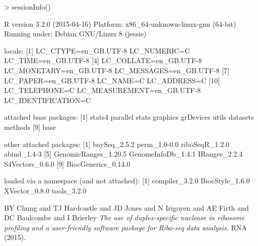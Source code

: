 \documentclass[a4paper]{article}
\begin{document}
\begin{Schunk}
\begin{Sinput}
> sessionInfo()
\end{Sinput}
\begin{Soutput}
R version 3.2.0 (2015-04-16)
Platform: x86_64-unknown-linux-gnu (64-bit)
Running under: Debian GNU/Linux 8 (jessie)

locale:
 [1] LC_CTYPE=en_GB.UTF-8       LC_NUMERIC=C               LC_TIME=en_GB.UTF-8       
 [4] LC_COLLATE=en_GB.UTF-8     LC_MONETARY=en_GB.UTF-8    LC_MESSAGES=en_GB.UTF-8   
 [7] LC_PAPER=en_GB.UTF-8       LC_NAME=C                  LC_ADDRESS=C              
[10] LC_TELEPHONE=C             LC_MEASUREMENT=en_GB.UTF-8 LC_IDENTIFICATION=C       

attached base packages:
[1] stats4    parallel  stats     graphics  grDevices utils     datasets  methods  
[9] base     

other attached packages:
[1] baySeq_2.5.2         perm_1.0-0.0         riboSeqR_1.2.0       abind_1.4-3         
[5] GenomicRanges_1.20.5 GenomeInfoDb_1.4.1   IRanges_2.2.4        S4Vectors_0.6.0     
[9] BiocGenerics_0.14.0 

loaded via a namespace (and not attached):
[1] compiler_3.2.0  BiocStyle_1.6.0 XVector_0.8.0   tools_3.2.0    
\end{Soutput}
\end{Schunk}

\begin{thebibliography}{99}
 BY Chung and TJ Hardcastle and JD Jones and N Irigoyen and AE Firth and DC Baulcombe and I Brierley \textsl{The use of duplex-specific nuclease in ribosome profiling and a user-friendly software package for Ribo-seq data analysis.} RNA (2015).
\end{thebibliography}
\end{document}
